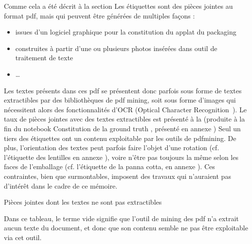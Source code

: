             Comme cela a été décrit à la section  Les étiquettes sont des pièces jointes au format pdf, mais qui peuvent être générées de multiples façons : 
            \begin{itemize}
                \item issues d'un logiciel graphique pour la constitution du applat du packaging
                \item construites à partir d'une ou plusieurs photos insérées dans outil de traitement de texte
                \item \dots
            \end{itemize}
            Les textes présents dans ces pdf se présentent donc parfois sous forme de textes extractibles par des bibliothèques de pdf mining, soit sous forme d'images qui nécessitent alors des fonctionnalités d'OCR (Optical Character Recognition~\cite{OCR_wiki}).
            Le taux de pièces jointes avec des textes extractibles est présenté à la  (produite à la fin du notebook \og Constitution de la ground truth \fg, présenté en annexe )
            Seul un tiers des étiquettes ont un contenu exploitable par les outils de pdfmining.
            De plus, l'orientation des textes peut parfois faire l'objet d'une rotation (cf. l'étiquette des lentilles en annexe ), voire n'être pas toujours la même selon les faces de l'emballage (cf. l'étiquette de la panna cotta, en annexe ).
            Ces contraintes, bien que surmontables, imposent des travaux qui n'auraient pas d'intérêt dans le cadre de ce mémoire.

            \begin{table}[htbp]
                \begin{center}
                \caption{Pièces jointes dont les textes ne sont pas extractibles}
                \label{tbl:empty_attached_files}
                
                \bigskip

                Dans ce tableau, le terme \og vide \fg signifie que l'outil de mining des pdf n'a extrait aucun texte du document, et donc que son contenu semble ne pas être exploitable via cet outil.
                \end{center}
            \end{table}


